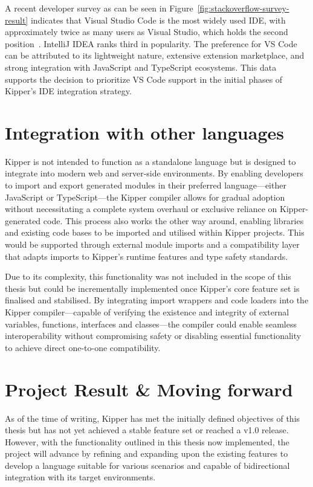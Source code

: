 A recent developer survey as can be seen in Figure~\ref{fig:stackoverflow-survey-result} indicates that Visual Studio Code is the most widely used IDE, with approximately twice as many users as Visual Studio, which holds the second position~\cite{stackoverflow2024}. IntelliJ IDEA ranks third in popularity. The preference for VS Code can be attributed to its lightweight nature, extensive extension marketplace, and strong integration with JavaScript and TypeScript ecosystems. This data supports the decision to prioritize VS Code support in the initial phases of Kipper's IDE integration strategy.

\section{Integration with other languages}

Kipper is not intended to function as a standalone language but is designed to integrate into modern web and server-side environments. By enabling developers to import and export generated modules in their preferred language—either JavaScript or TypeScript—the Kipper compiler allows for gradual adoption without necessitating a complete system overhaul or exclusive reliance on Kipper-generated code. This process also works the other way around, enabling libraries and existing code bases to be imported and utilised within Kipper projects. This would be supported through external module imports and a compatibility layer that adapts imports to Kipper's runtime features and type safety standards.

Due to its complexity, this functionality was not included in the scope of this thesis but could be incrementally implemented once Kipper's core feature set is finalised and stabilised. By integrating import wrappers and code loaders into the Kipper compiler—capable of verifying the existence and integrity of external variables, functions, interfaces and classes—the compiler could enable seamless interoperability without compromising safety or disabling essential functionality to achieve direct one-to-one compatibility.

\section{Project Result \& Moving forward}

As of the time of writing, Kipper has met the initially defined objectives of this thesis but has not yet achieved a stable feature set or reached a v1.0 release. However, with the functionality outlined in this thesis now implemented, the project will advance by refining and expanding upon the existing features to develop a language suitable for various scenarios and capable of bidirectional integration with its target environments.


